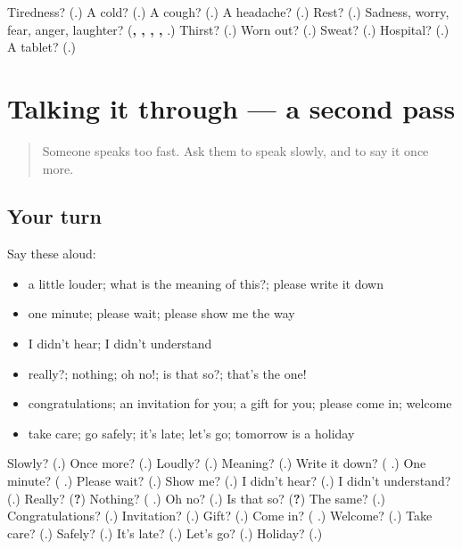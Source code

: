 \begin{tcolorbox}[breakable,colback=teal!4,colframe=teal!35!black,title={Before you move on}]
Tiredness? (\textbf{}.) A cold? (\textbf{}.) A cough? (\textbf{}.) A headache? (\textbf{}.) Rest? (\textbf{}.) Sadness, worry, fear, anger, laughter? (\textbf{, , , , }.) Thirst? (\textbf{}.) Worn out? (\textbf{}.) Sweat? (\textbf{}.) Hospital? (\textbf{}.) A tablet? (\textbf{}.)
\end{tcolorbox}
\section[(dialogue)]{Talking it through — a second pass}

\label{lesson:KA-R89-second-pass-repair-replies-welcome}



\begin{quote}
Someone speaks too fast. Ask them to speak slowly, and to say it once more.
\end{quote}

\subsection*{Your turn}
Say these aloud:

\begin{itemize}
\raggedright
  \item a little louder; what is the meaning of this?; please write it down
  \item one minute; please wait; please show me the way
  \item I didn't hear; I didn't understand
  \item really?; nothing; oh no!; is that so?; that's the one!
  \item congratulations; an invitation for you; a gift for you; please come in; welcome
  \item take care; go safely; it's late; let's go; tomorrow is a holiday
\end{itemize}

\begin{tcolorbox}[breakable,colback=teal!4,colframe=teal!35!black,title={Before you move on}]
Slowly? (\textbf{}.) Once more? (\textbf{}.) Loudly? (\textbf{}.) Meaning? (\textbf{}.) Write it down? (\textbf{ }.) One minute? (\textbf{ }.) Please wait? (\textbf{}.) Show me? (\textbf{}.) I didn't hear? (\textbf{}.) I didn't understand? (\textbf{}.) Really? (\textbf{?}) Nothing? (\textbf{ }.) Oh no? (\textbf{}.) Is that so? (\textbf{?}) The same? (\textbf{}.) Congratulations? (\textbf{}.) Invitation? (\textbf{}.) Gift? (\textbf{}.) Come in? (\textbf{ }.) Welcome? (\textbf{}.) Take care? (\textbf{}.) Safely? (\textbf{}.) It's late? (\textbf{}.) Let's go? (\textbf{}.) Holiday? (\textbf{}.)
\end{tcolorbox}
